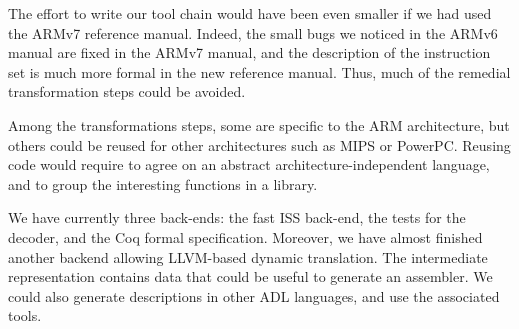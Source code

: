 \documentclass[conference]{ieeeconf}
\begin{document}
The effort to write our tool chain would have been even smaller if we had used
the ARMv7 reference manual. Indeed, the small bugs we noticed in the ARMv6
manual are fixed in the ARMv7 manual, and the description of the instruction set
is much more formal in the new reference manual. Thus, much of the remedial
transformation steps could be avoided.

Among the transformations steps, some are specific to the ARM architecture, but
others could be reused for other architectures such as MIPS or PowerPC. Reusing
code would require to agree on an abstract architecture-independent language,
and to group the interesting functions in a library.

We have currently three back-ends: the fast ISS back-end, the tests for the
decoder, and the Coq formal specification. Moreover, we have almost finished
another backend allowing LLVM-based dynamic translation.
The intermediate representation contains data that could be useful to generate
an assembler.  We could also generate descriptions in other ADL languages, and
use the associated tools.



\end{document}

